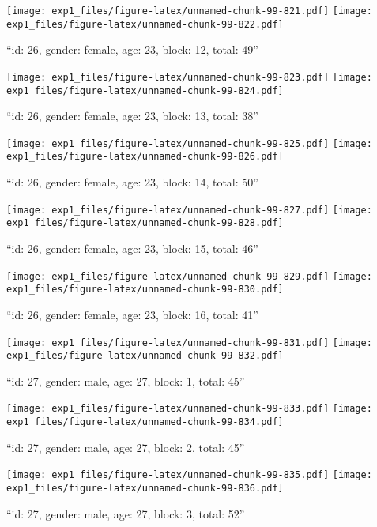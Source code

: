 \documentclass[,]{article}
\begin{document}
\texttt{[image: exp1\_files/figure-latex/unnamed-chunk-99-821.pdf]}
\texttt{[image: exp1\_files/figure-latex/unnamed-chunk-99-822.pdf]}

\newpage
[1] 

``id: 26, gender: female, age: 23, block: 12, total: 49''

\texttt{[image: exp1\_files/figure-latex/unnamed-chunk-99-823.pdf]}
\texttt{[image: exp1\_files/figure-latex/unnamed-chunk-99-824.pdf]}

\newpage
[1] 

``id: 26, gender: female, age: 23, block: 13, total: 38''

\texttt{[image: exp1\_files/figure-latex/unnamed-chunk-99-825.pdf]}
\texttt{[image: exp1\_files/figure-latex/unnamed-chunk-99-826.pdf]}

\newpage
[1] 

``id: 26, gender: female, age: 23, block: 14, total: 50''

\texttt{[image: exp1\_files/figure-latex/unnamed-chunk-99-827.pdf]}
\texttt{[image: exp1\_files/figure-latex/unnamed-chunk-99-828.pdf]}

\newpage
[1] 

``id: 26, gender: female, age: 23, block: 15, total: 46''

\texttt{[image: exp1\_files/figure-latex/unnamed-chunk-99-829.pdf]}
\texttt{[image: exp1\_files/figure-latex/unnamed-chunk-99-830.pdf]}

\newpage
[1] 

``id: 26, gender: female, age: 23, block: 16, total: 41''

\texttt{[image: exp1\_files/figure-latex/unnamed-chunk-99-831.pdf]}
\texttt{[image: exp1\_files/figure-latex/unnamed-chunk-99-832.pdf]}

\newpage
[1] 

``id: 27, gender: male, age: 27, block: 1, total: 45''

\texttt{[image: exp1\_files/figure-latex/unnamed-chunk-99-833.pdf]}
\texttt{[image: exp1\_files/figure-latex/unnamed-chunk-99-834.pdf]}

\newpage
[1] 

``id: 27, gender: male, age: 27, block: 2, total: 45''

\texttt{[image: exp1\_files/figure-latex/unnamed-chunk-99-835.pdf]}
\texttt{[image: exp1\_files/figure-latex/unnamed-chunk-99-836.pdf]}

\newpage
[1] 

``id: 27, gender: male, age: 27, block: 3, total: 52''
\end{document}
